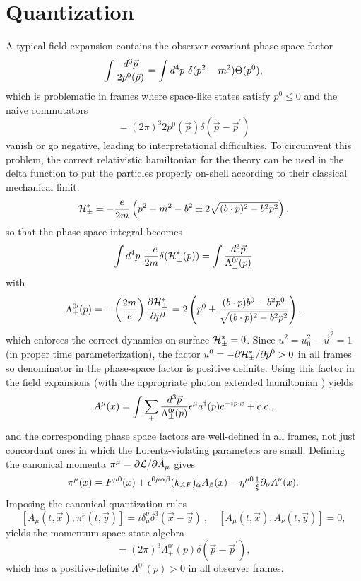 \documentclass[a4paper]{jpconf}
\def\ep{\epsilon}
\def\La{\Lambda}
\def\frac#1#2{{\textstyle{{#1}\over {#2}}}}
\newcommand{\beq}{\begin{displaymath}}
\newcommand{\eeq}{\end{displaymath}}
\begin{document}
\section{Quantization}
A typical field expansion contains the observer-covariant phase space factor
\beq
\int {d^3 \vec p \over 2 p^0(\vec p)} = \int d^4 p~ \delta (p^2 - m^2) \Theta(p^0),
\eeq
which is problematic in frames where space-like states satisfy $p^0 \le 0$ and the naive 
commutators
\beq
[a(p), a^\dagger(p)] = (2 \pi)^3 2 p^0(\vec p) \delta (\vec p - \vec p^\prime)
\eeq
vanish or go negative, leading to interpretational difficulties.
To circumvent this problem, the correct relativistic hamiltonian for the theory can be used
in the delta function to put the particles properly on-shell according to their classical mechanical
limit.
\beq
{\cal H}^*_\pm 
= - {e \over 2 m} \left( p^2 - m^2 - b^2 \pm 2 \sqrt{(b \cdot p)^2 - b^2 p^2}\right),
\eeq
so that the phase-space integral becomes
\beq
\int d^4 p ~ {-e \over 2 m}\delta ({\cal H}_\pm^*(p))  = \int {d^3 \vec p \over \La_\pm^{0 \prime}(p)}
\eeq
with
\beq
\La_\pm^{0 \prime}(p) = - \left( {2m \over e} \right){\partial{\cal H}^*_\pm \over \partial p^0} 
= 2 \left( p^0 
\pm {(b \cdot p) b^0 - b^2 p^0 \over \sqrt{(b \cdot p)^2 - b^2 p^2}} \right),
\eeq
which enforces the correct dynamics on surface ${\cal H}_\pm^* = 0$.
Since $u^2 =u_0^2 - \vec u^2 =1$ (in proper time parameterization), 
the factor $u^0 = - \partial {\cal H}^*_\pm / \partial p^0  > 0$ in all frames
so denominator in the phase-space factor is positive definite.
Using this factor in the field expansions (with the appropriate photon extended hamiltonian
\cite{covphotquant}) yields
\beq
A^\mu(x) = \int \sum_\pm {d^3 \vec p \over \La_\pm^{0 \prime}(p)} 
\ep^\mu a^\dagger (p) e^{-i p \cdot x} + c.c.,
\eeq
and the corresponding phase space factors are well-defined in all frames, not just concordant 
\cite{ralph}
ones in which the Lorentz-violating parameters are small.
Defining the canonical momenta $\pi^\mu = \partial {\cal L} / \partial \dot A_\mu$ gives
\beq
\pi^\mu(x) = F^{\mu 0}(x) + \epsilon^{0\mu\alpha\beta}(k_{AF})_\alpha A_\beta(x) - \eta^{\mu 0}\frac{1}{\xi}\partial_\nu A^\nu(x).
\eeq
Imposing the canonical quantization rules
\beq
\left[A_\mu(t,\vec{x}),\pi^\nu(t,\vec{y})\right] = i\delta^{\nu}_\mu \delta^3(\vec{x}-\vec{y})\ , \quad
\left[A_\mu(t,\vec{x}),A_\nu(t,\vec{y})\right] = 0,
\eeq
yields the momentum-space state algebra
\beq
[a(\vec p), a^\dagger (\vec p^\prime)] = (2 \pi)^3 \La_\pm^{0 \prime}(p) \delta (\vec p - \vec p^\prime),
\eeq
which has a positive-definite $\La_\pm^{0 \prime}(p) > 0$ in all observer frames.
\end{document}
